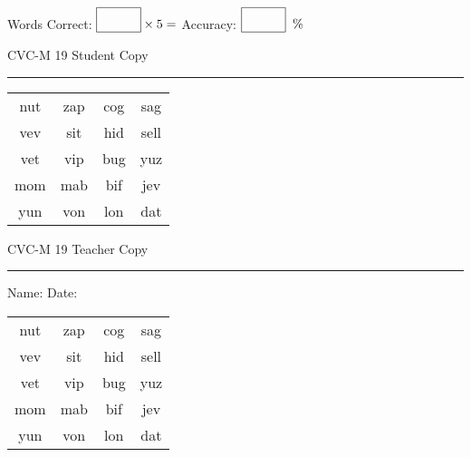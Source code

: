 \documentclass{memoir}
\begin{document}
\small

Words Correct: $\fbox{\phantom{\huge 100}} \times 5 = $ Accuracy: $\fbox{\phantom{\huge 100}}\;\; \%$ 

\vfill

\newpage


\footnotesize \noindent
CVC-M 19 \hfill Student Copy
\smallskip
\hrule

\Large

\setlength{\tabcolsep}{14pt}
\def\arraystretch{2}

{\selectfont


\begin{vplace}[0.5]
\begin{center}
\begin{tabular}{cccc}
nut & zap & cog & sag \\
vev & sit & hid & sell \\
vet & vip & bug & yuz \\
mom & mab & bif & jev \\
yun & von & lon & dat \\
\end{tabular}
\end{center}
\end{vplace}

}

\newpage

\footnotesize \noindent
CVC-M 19 \hfill Teacher Copy
\smallskip
\hrule

\small

\vfill

\noindent
Name: \underline{\hspace{1.75in}} \hfill Date: \underline{\hspace{1in}}

\Large

{\selectfont


\begin{vplace}[0.5]
\begin{center}
\begin{tabular}{cccc}
nut & zap & cog & sag \\
vev & sit & hid & sell \\
vet & vip & bug & yuz \\
mom & mab & bif & jev \\
yun & von & lon & dat \\
\end{tabular}
\end{center}
\end{vplace}



}
\end{document}
